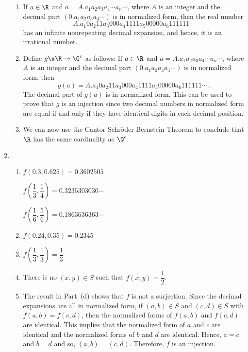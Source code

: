\begin{enumerate}
\begin{enumerate}
\item If $a \in \R$ and $a = A.a_1 a_2 a_3 a_4 \cdots a_n \cdots$, where $A$ is an integer and the decimal part $( 0.a_1 a_2 a_3 a_4 \cdots )$ is in normalized form, then the real number
\[
A.a_1 0 a_2 1 1 a_3 0 0 0 a_4 1 1 1 1 a_5 0 0 0 0 0 a_6 1 1 1 1 1 1 \cdots 
\]
has an infinite nonrepeating decimal expansion, and hence, it is an irrational number.

\item Define $g\x \R \to \Q^c$ as follows:  If $a \in \R$ and $a = A.a_1 a_2 a_3 a_4 \cdots a_n \cdots$, where $A$ is an integer and the decimal part $( 0.a_1 a_2 a_3 a_4 \cdots )$ is in normalized form, then 
\[
g(a) = A.a_1 0 a_2 1 1 a_3 0 0 0 a_4 1 1 1 1 a_5 0 0 0 0 0 a_6 1 1 1 1 1 1 \cdots \,.
\]
The decimal part of $g(a)$ is in normalized form.  This can be used to prove that $g$ is an injection since two decimal numbers in normalized form are equal if and only if they have identical digits in each decimal position.

\item We can now use the Cantor-Schr\"{o}der-Bernstein Theorem to conclude that $\R$ has the same cardinality as $\Q^c$.
\end{enumerate}



\item \begin{enumerate}
\item \begin{multicols}{2}
$f ( 0.3, 0.625 ) = 0.3602505$ 

$f \!\left( \dfrac{1}{3}, \dfrac{1}{4} \right) = 0.3235303030 \cdots$

$f \!\left( \dfrac{1}{6}, \dfrac{5}{6} \right) = 0.1863636363 \cdots$
\end{multicols}

\item $f(0.24, 0.35) = 0.2345$

\item $f \!\left( \dfrac{1}{3}, \dfrac{1}{3} \right) = \dfrac{1}{3}$

\item There is no $(x, y) \in S$ such that $f(x, y) = \dfrac{1}{2}$.

\item The result in Part~(d) shows that $f$ is not a surjection.  Since the decimal expansions are all in normalized form, if $(a, b) \in S$ and $(c, d) \in S$ with $f(a, b) = f(c, d)$, then the normalized forms of $f(a, b)$ and $f(c, d)$ are identical.  This implies that the normalized form of $a$ and $c$ are identical and the normalized forms of $b$ and $d$ are identical.  Hence, 
$a = c$ and $b = d$ and so, $(a, b) = (c, d)$.  Therefore, $f$ is an injection.


\end{enumerate}
\end{enumerate}
